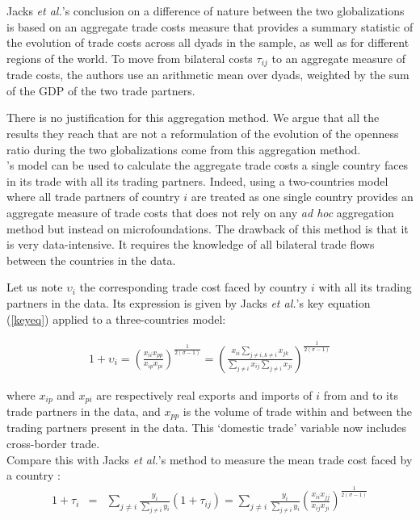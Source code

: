 \documentclass{article}
\begin{document}
Jacks \textit{et al.}'s conclusion on a difference of nature between the
two globalizations is based on an aggregate trade costs
measure that provides a summary statistic of the
evolution of trade costs across all dyads in the sample, as
well as for different regions of the world. To move from
bilateral costs $\tau_{ij}$ to an aggregate measure of trade
costs, the authors use an arithmetic mean over dyads, weighted
by the sum of the GDP of the two trade partners.

There is no justification for this aggregation method. We argue that
all the results they reach that are not a reformulation of the
evolution of the openness ratio during the two
globalizations come from this aggregation method.\\

\cite{AW2003}'s model can be used to calculate the aggregate
trade costs a single country faces in its trade with all
its trading partners. Indeed, using a two-countries model where
all trade partners of country $i$ are treated as one single
country provides an aggregate measure of trade costs that does
not rely on any \textit{ad hoc} aggregation method but instead on
microfoundations. The drawback of this method is that it is very data-intensive. It requires the knowledge of all bilateral trade flows between the countries in the data. 

Let us note $\upsilon_{i}$ the corresponding trade cost faced
by country $i$ with all its trading partners in the data. Its
expression is given by Jacks \textit{et al.}'s key equation
(\ref{keyeq}) applied to a three-countries model:

\begin{eqnarray}
1+\upsilon_{i}= \left(\frac{x_{ii} x_{pp}}{x_{ip}
x_{pi}}\right)^{\frac{1}{2(\sigma-1)}}
=\left(\frac{x_{ii} \sum_{j \neq i, k \neq i } x_{jk}}{\sum_{j \neq i } x_{ij}\sum_{j \neq i} x_{ji}}\right)^{\frac{1}{2(\sigma-1)}}   \label{keyeq3model}
\end{eqnarray}

where $x_{ip}$ and $x_{pi}$ are respectively real exports and
imports of $i$ from and to its trade partners in the data, and
$x_{pp}$ is the volume of trade within and between the trading
partners present in the data. This `domestic trade' variable
now
includes cross-border trade. \\

Compare this with Jacks \textit{et al.}'s  method to measure the mean trade cost faced by a country : 
\begin{eqnarray}
1+\tau_i&=& \sum_{j \neq i}  {\frac{y_i}{\sum_{j \neq i} y_i} \left(1+\tau_{ij}\right)}
= \sum_{j \neq i}  {\frac{y_i}{\sum_{j \neq i} y_i} \left( \frac{x_{ii} x_{jj}}{x_{ij} x_{ji}}\right)^{\frac{1}{2(\sigma-1)}} }
\end{eqnarray}
\end{document}
